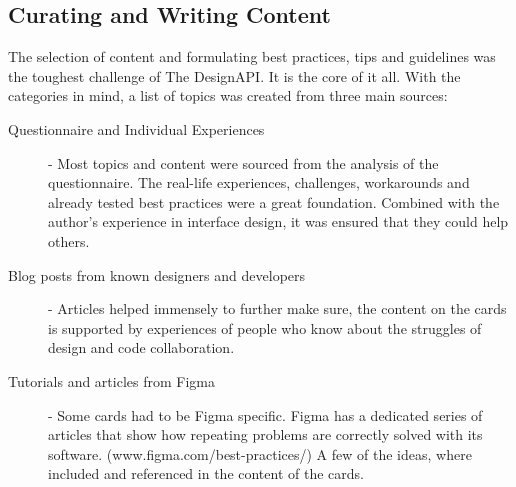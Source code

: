 \newpage
\subsection{Curating and Writing Content}
The selection of content and formulating best practices, tips and guidelines was the toughest
challenge of The DesignAPI. It is the core of it all. With the categories in mind, a list of topics
was created from three main sources:

\begin{description}
      \item[Questionnaire and Individual Experiences] - Most topics and content were
            sourced from the analysis of the questionnaire. The real-life experiences, challenges,
            workarounds and already tested best practices were a great foundation. Combined with the
            author's experience in interface design, it was ensured that they could help others.
      \item[Blog posts from known designers and developers] - Articles helped immensely to further
            make sure, the content on the cards is supported by experiences of people who know about
            the struggles of design and code collaboration.
      \item[Tutorials and articles from Figma] - Some cards had to be Figma specific. Figma has a
            dedicated series of articles that show how repeating problems are correctly solved with
            its software. (www.figma.com/best-practices/) A few of the ideas, where included and
            referenced in the content of the cards.
\end{description}


% 

